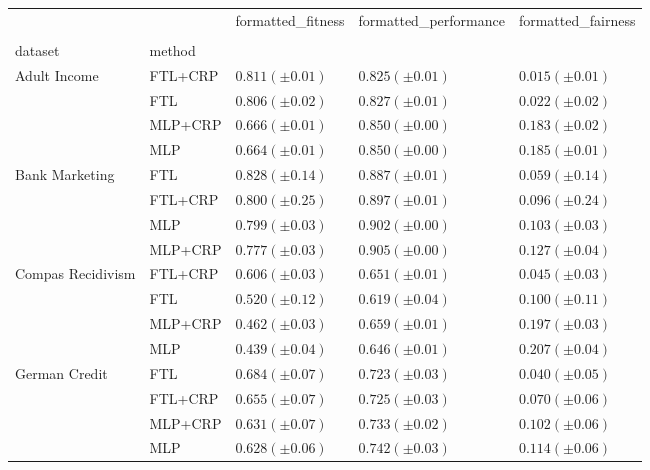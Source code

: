 \begin{tabular}{lllll}
\toprule
 &  & formatted_fitness & formatted_performance & formatted_fairness \\
 &  &  &  &  \\
dataset & method &  &  &  \\
\midrule
\multirow[t]{4}{*}{Adult Income} & FTL+CRP & $0.811 (\pm0.01)$ & $0.825 (\pm0.01)$ & $0.015 (\pm0.01)$ \\
 & FTL & $0.806 (\pm0.02)$ & $0.827 (\pm0.01)$ & $0.022 (\pm0.02)$ \\
 & MLP+CRP & $0.666 (\pm0.01)$ & $0.850 (\pm0.00)$ & $0.183 (\pm0.02)$ \\
 & MLP & $0.664 (\pm0.01)$ & $0.850 (\pm0.00)$ & $0.185 (\pm0.01)$ \\
\cline{1-5}
\multirow[t]{4}{*}{Bank Marketing} & FTL & $0.828 (\pm0.14)$ & $0.887 (\pm0.01)$ & $0.059 (\pm0.14)$ \\
 & FTL+CRP & $0.800 (\pm0.25)$ & $0.897 (\pm0.01)$ & $0.096 (\pm0.24)$ \\
 & MLP & $0.799 (\pm0.03)$ & $0.902 (\pm0.00)$ & $0.103 (\pm0.03)$ \\
 & MLP+CRP & $0.777 (\pm0.03)$ & $0.905 (\pm0.00)$ & $0.127 (\pm0.04)$ \\
\cline{1-5}
\multirow[t]{4}{*}{Compas Recidivism} & FTL+CRP & $0.606 (\pm0.03)$ & $0.651 (\pm0.01)$ & $0.045 (\pm0.03)$ \\
 & FTL & $0.520 (\pm0.12)$ & $0.619 (\pm0.04)$ & $0.100 (\pm0.11)$ \\
 & MLP+CRP & $0.462 (\pm0.03)$ & $0.659 (\pm0.01)$ & $0.197 (\pm0.03)$ \\
 & MLP & $0.439 (\pm0.04)$ & $0.646 (\pm0.01)$ & $0.207 (\pm0.04)$ \\
\cline{1-5}
\multirow[t]{4}{*}{German Credit} & FTL & $0.684 (\pm0.07)$ & $0.723 (\pm0.03)$ & $0.040 (\pm0.05)$ \\
 & FTL+CRP & $0.655 (\pm0.07)$ & $0.725 (\pm0.03)$ & $0.070 (\pm0.06)$ \\
 & MLP+CRP & $0.631 (\pm0.07)$ & $0.733 (\pm0.02)$ & $0.102 (\pm0.06)$ \\
 & MLP & $0.628 (\pm0.06)$ & $0.742 (\pm0.03)$ & $0.114 (\pm0.06)$ \\
\cline{1-5}
\bottomrule
\end{tabular}
